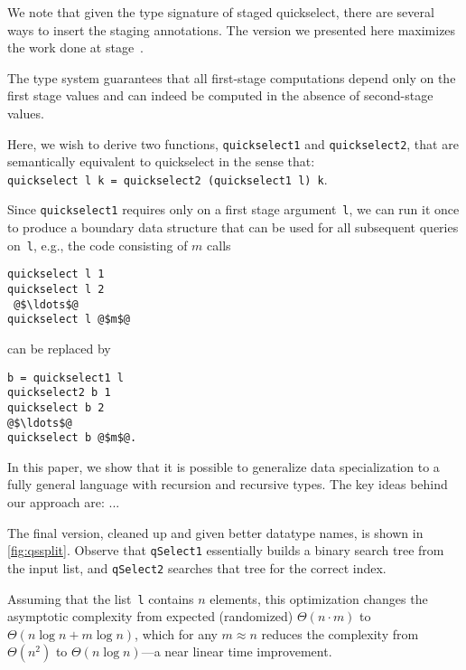 We note that given the type signature of staged quickselect, there are several
ways to insert the staging annotations.  The version we presented here maximizes
the work done at stage~\bbone.

The type system guarantees that all first-stage computations depend only on the
first stage values and can indeed be computed in the absence of second-stage
values.  



Here, we wish to derive two functions, \texttt{quickselect1} and
\texttt{quickselect2}, that are semantically equivalent to quickselect in
the sense that:
\\
\texttt{quickselect l k = quickselect2 (quickselect1 l) k}.
\\

Since \texttt{quickselect1} requires only on a first stage
argument~\texttt{l}, we can run it once to produce a boundary data
structure that can be used for all subsequent queries on~\texttt{l},
e.g.,  the code consisting of $m$ calls 
\begin{lstlisting}
quickselect l 1
quickselect l 2
 @$\ldots$@ 
quickselect l @$m$@
\end{lstlisting}
%
can be replaced by 
%
\begin{lstlisting}
b = quickselect1 l
quickselect2 b 1
quickselect b 2
@$\ldots$@ 
quickselect b @$m$@.
\end{lstlisting}

In this paper, we show that it is possible to generalize data
specialization to a fully general language with recursion and
recursive types.  The key ideas behind our approach are: ...


The final version, cleaned up and given better datatype names, is shown in
\ref{fig:qssplit}.  Observe that \texttt{qSelect1} essentially builds a binary
search tree from the input list, and \texttt{qSelect2} searches that tree for
the correct index.

Assuming that the list~\texttt{l} contains $n$ elements, this optimization
changes the asymptotic complexity from expected (randomized) $\Theta(n \cdot m)$
to $\Theta(n\log{n} + m\log{n})$, which for any $m \approx n$ reduces the
complexity from $\Theta (n^2)$ to $\Theta(n\log{n})$---a near linear time
improvement. 

